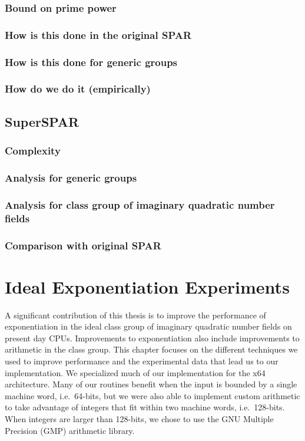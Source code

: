 \documentclass{ucalgthes1}
\theoremstyle{plain}
\theoremstyle{definition}
\begin{document}
\subsection{Bound on prime power}

\subsection{How is this done in the original SPAR}

\subsection{How is this done for generic groups}

\subsection{How do we do it (empirically)}


\section{SuperSPAR}

\subsection{Complexity}
\subsection{Analysis for generic groups}
\subsection{Analysis for class group of imaginary quadratic number fields}
\subsection{Comparison with original SPAR}


\chapter{Ideal Exponentiation Experiments}

A significant contribution of this thesis is to improve the performance of exponentiation in the ideal class group of imaginary quadratic number fields on present day CPUs.  Improvements to exponentiation also include improvements to arithmetic in the class group.  This chapter focuses on the different techniques we used to improve performance and the experimental data that lead us to our implementation.  We specialized much of our implementation for the x64 architecture.  Many of our routines benefit when the input is bounded by a single machine word, i.e.\ 64-bits, but we were also able to implement custom arithmetic to take advantage of integers that fit within two machine words, i.e.\ 128-bits. When integers are larger than 128-bits, we chose to use the GNU Multiple Precision (GMP) arithmetic library.
\end{document}
